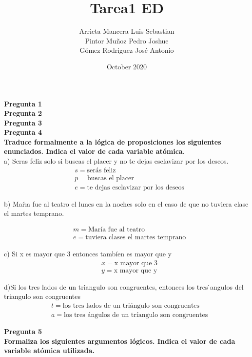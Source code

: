 \documentclass{article}
\title{Tarea1 ED}
\author{Arrieta Mancera Luis Sebastian\\ Pintor Muñoz Pedro Joshue\\ Gómez Rodriguez José Antonio }
\date{October 2020}
\begin{document}
\maketitle

\textbf{\Large Pregunta 1}\\
\textbf{\Large Pregunta 2}\\
\textbf{\Large Pregunta 3}\\
\textbf{\Large Pregunta 4}\\

 \textbf{Traduce formalmente a la lógica de proposiciones los siguientes enunciados. Indica el valor de cada variable atómica}.\\
    
a) Seras feliz solo si buscas el placer y no te dejas esclavizar por los deseos.
\begin{align*}
    &s=\text{serás feliz }\\
    &p=\text{buscas el placer}\\
    &e=\text{te dejas esclavizar por los deseos}
\end{align*}

b) Maŕıa fue al teatro el lunes en la noches solo en el caso de que no tuviera clase el martes temprano.

\begin{align*}
    &m=\text{María fue al teatro}\\
    &e=\text{tuviera clases el martes temprano}
\end{align*}

c) Si x es mayor que 3 entonces tambíen es mayor que y\\
\begin{align*}
    &x=\text{x mayor que 3}\\
    &y=\text{x mayor que y}
\end{align*}

d)Si los tres lados de un triangulo son congruentes, entonces los tres  ́angulos del triangulo son congruentes
\begin{align*}
    &t=\text{los tres lados de un triángulo son congruentes}\\
    &a=\text{los tres ángulos de un tríangulo son congruentes}
\end{align*}

\textbf{\Large Pregunta 5}\\
\textbf{Formaliza los siguientes argumentos lógicos. Indica el valor de cada variable atómica utilizada.}\\
\end{document}
